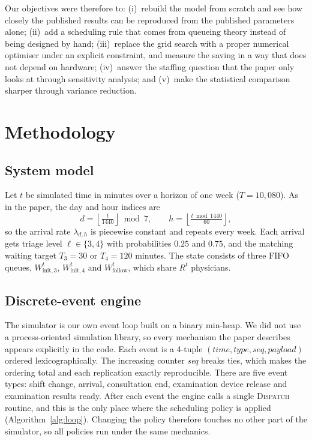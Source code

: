 \documentclass[sigconf,nonacm]{acmart}
\begin{document}
Our objectives were therefore to: (i)~rebuild the model from scratch and see
how closely the published results can be reproduced from the published
parameters alone; (ii)~add a scheduling rule that comes from queueing theory
instead of being designed by hand; (iii)~replace the grid search with a proper
numerical optimiser under an explicit constraint, and measure the saving in a
way that does not depend on hardware; (iv)~answer the staffing question that
the paper only looks at through sensitivity analysis; and (v)~make the
statistical comparison sharper through variance reduction.

\section{Methodology}

\subsection{System model}
Let $t$ be simulated time in minutes over a horizon of one week
($T=10{,}080$). As in the paper, the day and hour indices are
\begin{equation}
d = \left\lfloor \tfrac{t}{1440} \right\rfloor \bmod 7,
\qquad
h = \left\lfloor \tfrac{t \bmod 1440}{60} \right\rfloor ,
\end{equation}
so the arrival rate $\lambda_{d,h}$ is piecewise constant and repeats every
week. Each arrival gets triage level $\ell\in\{3,4\}$ with probabilities $0.25$
and $0.75$, and the matching waiting target $T_3=30$ or $T_4=120$ minutes. The
state consists of three FIFO queues, $W^t_{\text{init},3}$,
$W^t_{\text{init},4}$ and $W^t_{\text{follow}}$, which share $R^t$ physicians.

\subsection{Discrete-event engine}
The simulator is our own event loop built on a binary min-heap. We did not use
a process-oriented simulation library, so every mechanism the paper describes
appears explicitly in the code. Each event is a 4-tuple
$(\textit{time},\textit{type},\textit{seq},\textit{payload})$ ordered
lexicographically. The increasing counter \textit{seq} breaks ties, which makes
the ordering total and each replication exactly reproducible. There are five
event types: shift change, arrival, consultation end, examination device
release and examination results ready. After each event the engine calls a
single \textsc{Dispatch} routine, and this is the only place where the
scheduling policy is applied (Algorithm~\ref{alg:loop}). Changing the policy
therefore touches no other part of the simulator, so all policies run under
the same mechanics.
\end{document}

